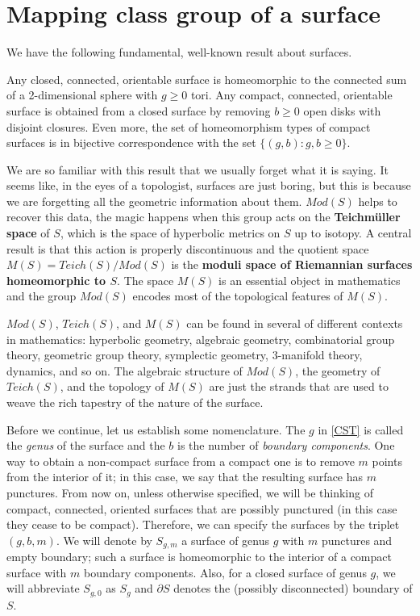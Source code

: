 \section{Mapping class group of a surface}

We have the following fundamental, well-known result about surfaces.

\begin{theorem}\label{CST}
Any closed, connected, orientable surface is homeomorphic to the connected sum of a 2-dimensional sphere with $g \geq 0$ tori. Any compact, connected, orientable surface is obtained from a closed surface by removing $b \geq 0 $ open disks with disjoint closures. Even more, the set of homeomorphism types of compact surfaces is in bijective correspondence with the set $\{ (g, b) : g, b \geq 0\}$.
\end{theorem}

We are so familiar with this result that we usually forget what it is saying. It seems like, in the eyes of a topologist, surfaces are just boring, but this is because we are forgetting all the geometric information about them. $Mod(S)$ helps to recover this data, the magic happens when this group acts on the \textbf{Teichmüller space} of $S$, which is the space of hyperbolic metrics on $S$ up to isotopy. A central result is that this action is properly discontinuous and the quotient space $M(S) = Teich(S)/ Mod(S)$ is the \textbf{moduli space of Riemannian surfaces homeomorphic to $S$}. The space $M(S)$ is an essential object in mathematics and the group $Mod(S)$ encodes most of the topological features of $M(S)$.

$Mod(S)$, $Teich(S)$, and $M(S)$ can be found in several of different contexts in mathematics: hyperbolic geometry, algebraic geometry, combinatorial group theory, geometric group theory, symplectic geometry, 3-manifold theory, dynamics, and so on. The algebraic structure of $Mod(S)$, the geometry of $Teich(S)$, and the topology of $M(S)$ are just the strands that are used to weave the rich tapestry of the nature of the surface.

Before we continue, let us establish some nomenclature. The $g$ in \ref{CST} is called the \textit{genus} of the surface and the $b$ is the number of \textit{boundary components}. One way to obtain a non-compact surface from a compact one is to remove $m$ points from the interior of it; in this case, we say that the resulting surface has $m$ punctures. From now on, unless otherwise specified, we will be thinking of compact, connected, oriented surfaces that are possibly punctured (in this case they cease to be compact). Therefore, we can specify the surfaces by the triplet $(g, b, m)$. We will denote by $S_{g,m}$ a surface of genus $g$ with $m$ punctures and empty boundary; such a surface is homeomorphic to the interior of a compact surface with $m$ boundary components. Also, for a closed surface of genus $g$, we will abbreviate $S_{g,0}$ as $S_{g}$ and $\partial S$ denotes the (possibly disconnected) boundary of $S$.

